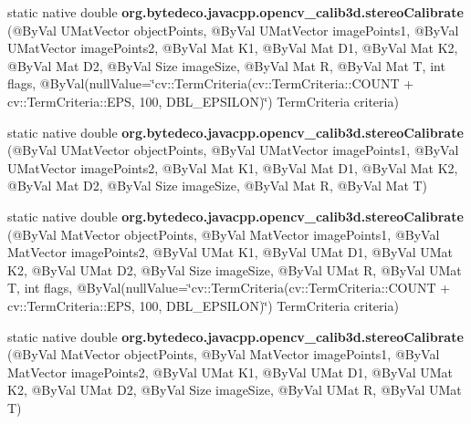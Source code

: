 \begin{DoxyCompactItemize}
static native double {\bfseries org.\+bytedeco.\+javacpp.\+opencv\+\_\+calib3d.\+stereo\+Calibrate} (@By\+Val U\+Mat\+Vector object\+Points, @By\+Val U\+Mat\+Vector image\+Points1, @By\+Val U\+Mat\+Vector image\+Points2, @By\+Val Mat K1, @By\+Val Mat D1, @By\+Val Mat K2, @By\+Val Mat D2, @By\+Val Size image\+Size, @By\+Val Mat R, @By\+Val Mat T, int flags, @By\+Val(null\+Value=\char`\"{}cv\+::\+Term\+Criteria(cv\+::\+Term\+Criteria\+::\+C\+O\+U\+NT + cv\+::\+Term\+Criteria\+::\+E\+PS, 100, D\+B\+L\+\_\+\+E\+P\+S\+I\+L\+ON)\char`\"{}) Term\+Criteria criteria)
\item 
\mbox{\label{group__calib3d__fisheye_ga8df93ec379aec8070caa281b82548450}} 
static native double {\bfseries org.\+bytedeco.\+javacpp.\+opencv\+\_\+calib3d.\+stereo\+Calibrate} (@By\+Val U\+Mat\+Vector object\+Points, @By\+Val U\+Mat\+Vector image\+Points1, @By\+Val U\+Mat\+Vector image\+Points2, @By\+Val Mat K1, @By\+Val Mat D1, @By\+Val Mat K2, @By\+Val Mat D2, @By\+Val Size image\+Size, @By\+Val Mat R, @By\+Val Mat T)
\item 
\mbox{\label{group__calib3d__fisheye_ga71c2c97343095435ad42af9609e3b8ae}} 
static native double {\bfseries org.\+bytedeco.\+javacpp.\+opencv\+\_\+calib3d.\+stereo\+Calibrate} (@By\+Val Mat\+Vector object\+Points, @By\+Val Mat\+Vector image\+Points1, @By\+Val Mat\+Vector image\+Points2, @By\+Val U\+Mat K1, @By\+Val U\+Mat D1, @By\+Val U\+Mat K2, @By\+Val U\+Mat D2, @By\+Val Size image\+Size, @By\+Val U\+Mat R, @By\+Val U\+Mat T, int flags, @By\+Val(null\+Value=\char`\"{}cv\+::\+Term\+Criteria(cv\+::\+Term\+Criteria\+::\+C\+O\+U\+NT + cv\+::\+Term\+Criteria\+::\+E\+PS, 100, D\+B\+L\+\_\+\+E\+P\+S\+I\+L\+ON)\char`\"{}) Term\+Criteria criteria)
\item 
\mbox{\label{group__calib3d__fisheye_gaafa97ec7987c001dc40d2c4486cb1238}} 
static native double {\bfseries org.\+bytedeco.\+javacpp.\+opencv\+\_\+calib3d.\+stereo\+Calibrate} (@By\+Val Mat\+Vector object\+Points, @By\+Val Mat\+Vector image\+Points1, @By\+Val Mat\+Vector image\+Points2, @By\+Val U\+Mat K1, @By\+Val U\+Mat D1, @By\+Val U\+Mat K2, @By\+Val U\+Mat D2, @By\+Val Size image\+Size, @By\+Val U\+Mat R, @By\+Val U\+Mat T)
\item 
\mbox{\label{group__calib3d__fisheye_ga6059aafb1c15b2dfbaa724a825882871}} 

\end{DoxyCompactItemize}
